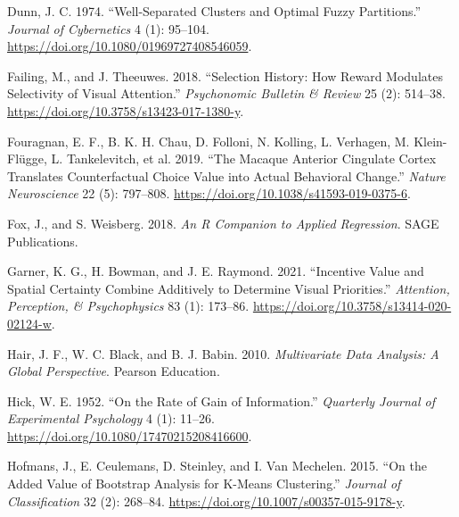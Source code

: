 \documentclass[11pt,halfline,a4paper,]{ouparticle}
\newlength{\cslhangindent}
\newlength{\cslentryspacingunit} %
\newenvironment{CSLReferences}[2] %
 {%
  \setlength{\parindent}{0pt}
  \ifodd #1
  \let\oldpar\par
  \def\par{\hangindent=\cslhangindent\oldpar}
  \fi
  \setlength{\parskip}{#2\cslentryspacingunit}
 }%
 {}
\begin{document}
\begin{CSLReferences}{1}{0}
\leavevmode{}%
Dunn, J. C. 1974. {``Well-{Separated Clusters} and {Optimal Fuzzy Partitions}.''} \emph{Journal of Cybernetics} 4 (1): 95--104. \url{https://doi.org/10.1080/01969727408546059}.

\leavevmode{}%
Failing, M., and J. Theeuwes. 2018. {``Selection History: {How} Reward Modulates Selectivity of Visual Attention.''} \emph{Psychonomic Bulletin \& Review} 25 (2): 514--38. \url{https://doi.org/10.3758/s13423-017-1380-y}.

\leavevmode{}%
Fouragnan, E. F., B. K. H. Chau, D. Folloni, N. Kolling, L. Verhagen, M. Klein-Flügge, L. Tankelevitch, et al. 2019. {``The Macaque Anterior Cingulate Cortex Translates Counterfactual Choice Value into Actual Behavioral Change.''} \emph{Nature Neuroscience} 22 (5): 797--808. \url{https://doi.org/10.1038/s41593-019-0375-6}.

\leavevmode{}%
Fox, J., and S. Weisberg. 2018. \emph{An {R Companion} to {Applied Regression}}. {SAGE Publications}.

\leavevmode{}%
Garner, K. G., H. Bowman, and J. E. Raymond. 2021. {``Incentive Value and Spatial Certainty Combine Additively to Determine Visual Priorities.''} \emph{Attention, Perception, \& Psychophysics} 83 (1): 173--86. \url{https://doi.org/10.3758/s13414-020-02124-w}.

\leavevmode{}%
Hair, J. F., W. C. Black, and B. J. Babin. 2010. \emph{Multivariate {Data Analysis}: {A Global Perspective}}. {Pearson Education}.

\leavevmode{}%
Hick, W. E. 1952. {``On the {Rate} of {Gain} of {Information}.''} \emph{Quarterly Journal of Experimental Psychology} 4 (1): 11--26. \url{https://doi.org/10.1080/17470215208416600}.

\leavevmode{}%
Hofmans, J., E. Ceulemans, D. Steinley, and I. Van Mechelen. 2015. {``On the {Added Value} of {Bootstrap Analysis} for {K-Means Clustering}.''} \emph{Journal of Classification} 32 (2): 268--84. \url{https://doi.org/10.1007/s00357-015-9178-y}.


\end{CSLReferences}
\end{document}
